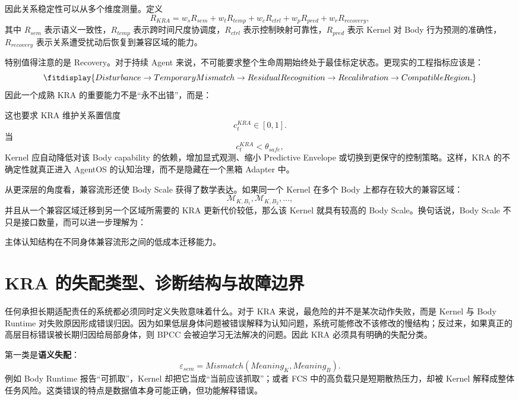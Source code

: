 因此关系稳定性可以从多个维度测量。定义
\[
R_{KRA}
=
w_sR_{sem}
+
w_tR_{temp}
+
w_cR_{ctrl}
+
w_pR_{pred}
+
w_rR_{recovery},
\]
其中 $R_{sem}$ 表示语义一致性，$R_{temp}$ 表示跨时间尺度协调度，$R_{ctrl}$ 表示控制映射可靠性，$R_{pred}$ 表示 Kernel 对 Body 行为预测的准确性，$R_{recovery}$ 表示关系遭受扰动后恢复到兼容区域的能力。

特别值得注意的是 Recovery。对于持续 Agent 来说，不可能要求整个生命周期始终处于最佳标定状态。更现实的工程指标应该是：
\[
\fitdisplay{
Disturbance
\rightarrow
TemporaryMismatch
\rightarrow
ResidualRecognition
\rightarrow
Recalibration
\rightarrow
CompatibleRegion.
}
\]
因此一个成熟 KRA 的重要能力不是``永不出错''，而是：
\begin{statementbox}
\centering
{}
\end{statementbox}

这也要求 KRA 维护关系置信度
\[
c_t^{KRA}
\in[0,1].
\]
当
\[
c_t^{KRA}<\theta_{safe},
\]
Kernel 应自动降低对该 Body capability 的依赖，增加显式观测、缩小 Predictive Envelope 或切换到更保守的控制策略。这样，KRA 的不确定性就真正进入 AgentOS 的认知治理，而不是隐藏在一个黑箱 Adapter 中。

从更深层的角度看，兼容流形还使 Body Scale 获得了数学表达。如果同一个 Kernel 在多个 Body 上都存在较大的兼容区域：
\[
\mathcal M_{K,B_1},
\mathcal M_{K,B_2},
\dots ,
\]
并且从一个兼容区域迁移到另一个区域所需要的 KRA 更新代价较低，那么该 Kernel 就具有较高的 Body Scale。换句话说，Body Scale 不只是接口数量，而可以进一步理解为：
\begin{statementbox}
主体认知结构在不同身体兼容流形之间的低成本迁移能力。
\end{statementbox}

\section{KRA 的失配类型、诊断结构与故障边界}
\label{sec:kra-failure-diagnostics}

任何承担长期适配责任的系统都必须同时定义失败意味着什么。对于 KRA 来说，最危险的并不是某次动作失败，而是 Kernel 与 Body Runtime 对失败原因形成错误归因。因为如果低层身体问题被错误解释为认知问题，系统可能修改不该修改的慢结构；反过来，如果真正的高层目标错误被长期归因给局部身体，则 BPCC 会被迫学习无法解决的问题。因此 KRA 必须具有明确的失配分类。

第一类是\textbf{语义失配}：
\[
\varepsilon_{sem}
=
Mismatch
\left(
Meaning_K,
Meaning_B
\right).
\]
例如 Body Runtime 报告``可抓取''，Kernel 却把它当成``当前应该抓取''；或者 FCS 中的高负载只是短期散热压力，却被 Kernel 解释成整体任务风险。这类错误的特点是数据值本身可能正确，但功能解释错误。

